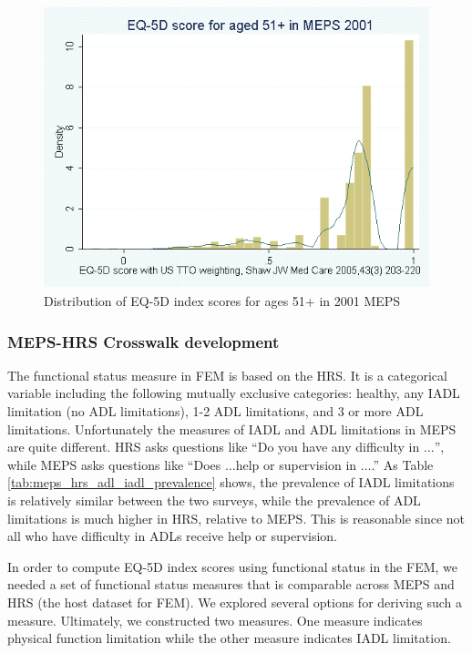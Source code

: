 \begin{figure}[h]
\centering
\includegraphics[scale=0.8]{./img/meps2001_age51p_eq5d_hist.png}
\caption{Distribution of EQ-5D index scores for ages 51+ in 2001 MEPS}
\label{fig:meps2001_age51p_eq5d_hist} 
\end{figure}

\subsubsection{MEPS-HRS Crosswalk development}
\label{sec:model_development_qalys_crosswalk}
The functional status measure in FEM is based on the HRS. It is a categorical 
variable including the following mutually exclusive categories: healthy, any IADL 
limitation (no ADL limitations), 1-2 ADL limitations, and 3 or more ADL limitations. 
Unfortunately the measures of IADL and ADL limitations in MEPS are quite different. 
HRS asks questions like ``Do you have any difficulty in $\ldots$'', while MEPS asks 
questions like ``Does $\ldots$help or supervision in $\ldots$.'' As Table 
\ref{tab:meps_hrs_adl_iadl_prevalence} shows, the prevalence of 
IADL limitations is relatively similar between the two surveys, while the 
prevalence of ADL limitations is much higher in HRS, relative to MEPS. This is 
reasonable since not all who have difficulty in ADLs receive help or supervision. 

In order to compute EQ-5D index scores using functional status in the FEM, we needed
a set of functional status measures that is comparable across MEPS and HRS (the host 
dataset for FEM).  We explored several options for deriving such a measure.  Ultimately,
we constructed two measures. One measure indicates physical function limitation 
while the other measure indicates IADL limitation. 

